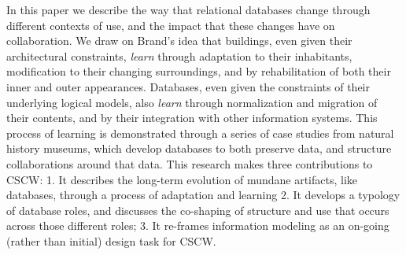 In this paper we describe the way that relational databases change through different contexts of use, and the impact that these changes have on collaboration. We draw on Brand's idea that buildings, even given their architectural constraints, \emph{learn} through adaptation to their inhabitants, modification to their changing surroundings, and by rehabilitation of both their inner and outer appearances. Databases, even given the constraints of their underlying logical models, also \emph{learn} through normalization and migration of their contents, and by their integration with other information systems. This process of learning is demonstrated through a series of case studies from natural history museums, which develop databases to both preserve data, and structure collaborations around that data. This research makes three contributions to CSCW: 1. It describes the long-term evolution of mundane artifacts, like databases, through a process of adaptation and learning 2. It develops a typology of database roles, and discusses the co-shaping of structure and use that occurs across those different roles; 3. It re-frames information modeling as an on-going (rather than initial) design task for CSCW.